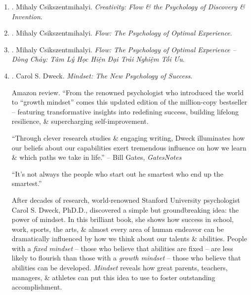 \documentclass{article}
\begin{document}
\begin{enumerate}
	\item \cite{Csikszentmihalyi_creativity}. {\sc Mihaly Csikszentmihalyi}. {\it Creativity: Flow \& the Psychology of Discovery \& Invention}.\hfill{\sf[reading]}

	\item \cite{Csikszentmihalyi_flow}. {\sc Mihaly Csikszentmihalyi}. {\it Flow: The Psychology of Optimal Experience}.\hfill{\sf[reading]}

	\item \cite{Csikszentmihalyi_flow_VN}. {\sc Mihaly Csikszentmihalyi}. {\it Flow: The Psychology of Optimal Experience -- Dòng Chảy: Tâm Lý Học Hiện Đại Trải Nghiệm Tối Ưu}.\hfill{\sf[done]}

	\item \cite{Dweck_mindset}. {\sc Carol S. Dweck}. {\it Mindset: The New Psychology of Success}. {}

	{\sf Amazon review.} ``From the renowned psychologist who introduced the world to ``growth mindset'' comes this updated edition of the million-copy bestseller -- featuring transformative insights into redefining success, building lifelong resilience, \& supercharging self-improvement.

	``Through clever research studies \& engaging writing, {\sc Dweck} illuminates how our beliefs about our capabilities exert tremendous influence on how we learn \& which paths we take in life.'' -- {\sc Bill Gates}, {\it GatesNotes}

	``It's not always the people who start out he smartest who end up the smartest.''

	After decades of research, world-renowned Stanford University psychologist {\sc Carol S. Dweck}, PhD.D., discovered a simple but groundbreaking idea: the power of mindset. In this brilliant book, she shows how success in school, work, sports, the arts, \& almost every area of human endeavor can be dramatically influenced by how we think about our talents \& abilities. People with a {\it fixed mindset} -- those who believe that abilities are fixed -- are less likely to flourish than those with a {\it growth mindset} -- those who believe that abilities can be developed. {\it Mindset} reveals how great parents, teachers, managers, \& athletes can put this idea to use to foster outstanding accomplishment.


\end{enumerate}
\end{document}
